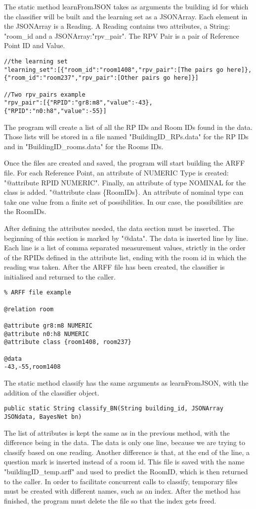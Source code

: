 The static method learnFromJSON takes as arguments the building id for which the classifier will be built and the learning set as a JSONArray. Each element in the JSONArray is a Reading. A Reading contains two attributes, a String: "room\_id and a JSONArray:"rpv\_pair". The RPV Pair is a pair of Reference Point ID and Value. 
\begin{lstlisting}
//the learning set
"learning_set":[{"room_id":"room1408","rpv_pair":[The pairs go here]},{"room_id":"room237","rpv_pair":[Other pairs go here]}]

//Two rpv_pairs example
"rpv_pair":[{"RPID":"gr8:m8","value":-43},{"RPID":"n0:h8","value":-55}]
\end{lstlisting}

The program will create a list of all the RP IDs and Room IDs found in the data. Those lists will be stored in a file named "BuildingID\_RPs.data" for the RP IDs and in "BuildingID\_rooms.data" for the Rooms IDs. 

Once the files are created and saved, the program will start building the ARFF file. For each Reference Point, an attribute of NUMERIC Type is created: "@attribute RPID NUMERIC". Finally, an attribute of type NOMINAL for the class is added. "@attribute class \{RoomIDs\}. An attribute of nominal type can take one value from a finite set of possibilities. In our case, the possibilities are the RoomIDs. 

After defining the attributes needed, the data section must be inserted. The beginning of this section is marked by "@data". The data is inserted line by line. Each line is a list of comma separated measurement values, strictly in the order of the RPIDs defined in the attribute list, ending with the room id in which the reading was taken. After the ARFF file has been created, the classifier is initialised and returned to the caller.
\begin{lstlisting}
% ARFF file example

@relation room

@attribute gr8:m8 NUMERIC
@attribute n0:h8 NUMERIC
@attribute class {room1408, room237}

@data 
-43,-55,room1408
\end{lstlisting}

The static method classify has the same arguments as learnFromJSON, with the addition of the classifier object. 
\begin{lstlisting} 
public static String classify_BN(String building_id, JSONArray JSONdata, BayesNet bn)
\end{lstlisting}
The list of attributes is kept the same as in the previous method, with the difference being in the data. The data is only one line, because we are trying to classify based on one reading. Another difference is that, at the end of the line, a question mark is inserted instead of a room id. This file is saved with the name "buildingID\_temp.arff" and used to predict the RoomID, which is then returned to the caller. In order to facilitate concurrent calls to classify, temporary files must be created with different names, such as an index. After the method has finished, the program must delete the file so that the index gets freed.

